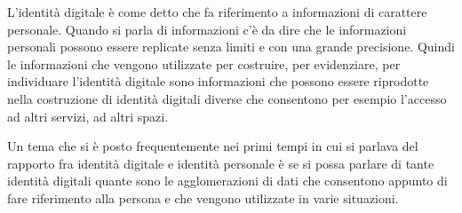 L'identità digitale è come detto che fa riferimento a informazioni di carattere personale. Quando si parla di informazioni c'è da dire che le informazioni personali possono essere replicate senza limiti e con una grande precisione. Quindi le informazioni che vengono utilizzate per costruire, per evidenziare, per individuare l'identità digitale sono informazioni che possono essere riprodotte nella costruzione di identità digitali diverse che consentono per esempio l'accesso ad altri servizi, ad altri spazi.\par
Un tema che si è posto frequentemente nei primi tempi in cui si parlava del rapporto fra identità digitale e identità personale è se si possa parlare di tante identità digitali quante sono le agglomerazioni di dati che consentono appunto di fare riferimento alla persona e che vengono utilizzate in varie situazioni.\par%

